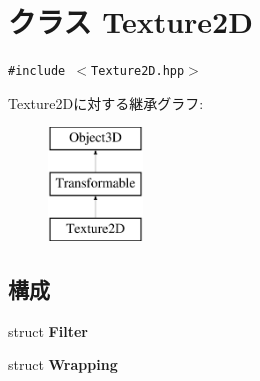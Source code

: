 \hypertarget{classm3g_1_1Texture2D}{
\section{クラス Texture2D}
\label{classm3g_1_1Texture2D}
}
{\tt \#include $<$Texture2D.hpp$>$}

Texture2Dに対する継承グラフ:\begin{figure}[H]
\begin{center}
\leavevmode
\includegraphics[height=3cm]{classm3g_1_1Texture2D}
\end{center}
\end{figure}
\subsection*{構成}
\begin{CompactItemize}
\item 
struct \textbf{Filter}
\item 
struct \textbf{Wrapping}
\end{CompactItemize}
